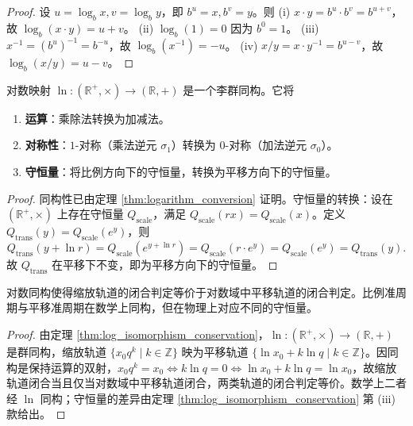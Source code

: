 \begin{proof}
设 $u = \log_b x, v = \log_b y$，即 $b^u = x, b^v = y$。则
(i) $x \cdot y = b^u \cdot b^v = b^{u+v}$，故 $\log_b(x \cdot y) = u + v$。
(ii) $\log_b(1) = 0$ 因为 $b^0 = 1$。
(iii) $x^{-1} = (b^u)^{-1} = b^{-u}$，故 $\log_b(x^{-1}) = -u$。
(iv) $x/y = x \cdot y^{-1} = b^{u-v}$，故 $\log_b(x/y) = u - v$。
\end{proof}

\begin{theorem}[对数群同构与守恒量转换]\label{thm:log_isomorphism_conservation}
对数映射 $\ln: (\mathbb{R}^+, \times) \to (\mathbb{R}, +)$ 是一个李群同构。它将
\begin{enumerate}[label=(\roman*)]
    \item \textbf{运算}：乘除法转换为加减法。
    \item \textbf{对称性}：$1$-对称（乘法逆元 $\sigma_1$）转换为 $0$-对称（加法逆元 $\sigma_0$）。
    \item \textbf{守恒量}：将比例方向下的守恒量，转换为平移方向下的守恒量。
\end{enumerate}
\end{theorem}

\begin{proof}
同构性已由定理 \ref{thm:logarithm_conversion} 证明。守恒量的转换：设在 $(\mathbb{R}^+, \times)$ 上存在守恒量 $Q_{\text{scale}}$，满足 $Q_{\text{scale}}(r x) = Q_{\text{scale}}(x)$。定义 $Q_{\text{trans}}(y) = Q_{\text{scale}}(e^y)$，则
\[
Q_{\text{trans}}(y + \ln r) = Q_{\text{scale}}(e^{y + \ln r}) = Q_{\text{scale}}(r \cdot e^y) = Q_{\text{scale}}(e^y) = Q_{\text{trans}}(y).
\]
故 $Q_{\text{trans}}$ 在平移下不变，即为平移方向下的守恒量。
\end{proof}

\begin{corollary}[对数判定等价]\label{cor:logarithm_judgement_equivalence}
对数同构使得缩放轨道的闭合判定等价于对数域中平移轨道的闭合判定。比例准周期与平移准周期在数学上同构，但在物理上对应不同的守恒量。
\end{corollary}

\begin{proof}
由定理 \ref{thm:log_isomorphism_conservation}，$\ln: (\mathbb{R}^+, \times) \to (\mathbb{R}, +)$ 是群同构，缩放轨道 $\{x_0 q^k \mid k\in\mathbb{Z}\}$ 映为平移轨道 $\{\ln x_0 + k\ln q \mid k\in\mathbb{Z}\}$。因同构是保持运算的双射，$x_0 q^k = x_0 \iff k\ln q = 0 \iff \ln x_0 + k\ln q = \ln x_0$，故缩放轨道闭合当且仅当对数域中平移轨道闭合，两类轨道的闭合判定等价。数学上二者经 $\ln$ 同构；守恒量的差异由定理 \ref{thm:log_isomorphism_conservation} 第 (iii) 款给出。
\end{proof}

